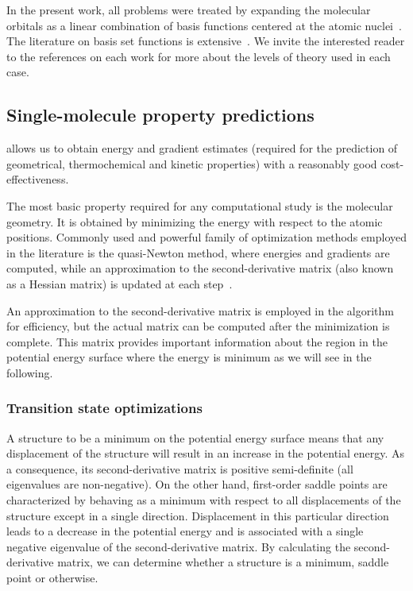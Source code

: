 In the present work, all problems were treated by expanding the molecular
orbitals as a linear combination of basis functions centered at the atomic
nuclei~\cite{Szabo_1996,Helgaker_1997,Jensen_2012,Hill_2012}.
The literature on basis set functions is extensive~\cite{Ditchfield_1971,Hehre_1972,Hariharan_1973,Hariharan_1974,Gordon_1980,Francl_1982,Clark_1983,Frisch_1984,Binning_1990,Blaudeau_1997,Rassolov_1998,Rassolov_2001}.
We invite the interested reader to the references on each work for more about
the levels of theory used in each case.

\subsection{Single-molecule property predictions}\label{sec:optimizations}

 allows us to obtain energy and gradient estimates (required for
the prediction of geometrical, thermochemical and kinetic properties) with a
reasonably good cost-effectiveness.

The most basic property required for any computational study is the molecular
geometry.
It is obtained by minimizing the energy with respect to the atomic positions.
Commonly used and powerful family of optimization methods employed in the
literature is the quasi-Newton method, where energies and gradients are
computed, while an approximation to the second-derivative matrix (also known as
a Hessian matrix) is updated at each step~\cite{Banerjee_1985,Schlegel_1987}.

An approximation to the second-derivative matrix is employed in the algorithm
for efficiency, but the actual matrix can be computed after the minimization is
complete.
This matrix provides important information about the region in the potential
energy surface where the energy is minimum as we will see in the following.

\subsubsection{Transition state optimizations}\label{sec:ts-optimizations}

A structure to be a minimum on the potential energy surface means that any
displacement of the structure will result in an increase in the potential
energy.
As a consequence, its second-derivative matrix
is positive semi-definite (all eigenvalues are non-negative).
On the other hand, first-order saddle points are characterized by behaving as
a minimum with respect to all displacements of the structure except in a single
direction.
Displacement in this particular direction leads to a decrease in the potential
energy and is associated with a single negative eigenvalue of the
second-derivative matrix.
By calculating the second-derivative matrix, we can determine whether a structure
is a minimum, saddle point or otherwise.

